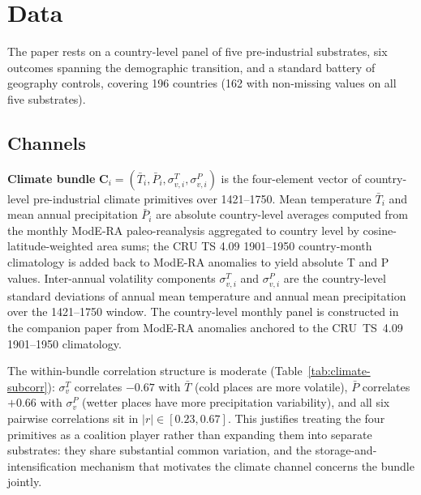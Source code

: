\documentclass[11pt,letterpaper]{article}
\begin{document}
\section{Data}
\label{sec:data}

The paper rests on a country-level panel of five pre-industrial substrates, six outcomes spanning the demographic transition, and a standard battery of geography controls, covering 196 countries (162 with non-missing values on all five substrates).

\subsection{Channels}
\label{sec:data-channels}

\textbf{Climate bundle} $\mathbf{C}_i = (\bar T_i, \bar P_i, \sigma_{v,i}^T, \sigma_{v,i}^P)$ is the four-element vector of country-level pre-industrial climate primitives over 1421--1750. Mean temperature $\bar T_i$ and mean annual precipitation $\bar P_i$ are absolute country-level averages computed from the monthly ModE-RA paleo-reanalysis \citep{franke2023modera} aggregated to country level by cosine-latitude-weighted area sums; the CRU TS 4.09 \citep{harris2020cruts} 1901--1950 country-month climatology is added back to ModE-RA anomalies to yield absolute T and P values. Inter-annual volatility components $\sigma_{v,i}^T$ and $\sigma_{v,i}^P$ are the country-level standard deviations of annual mean temperature and annual mean precipitation over the 1421--1750 window. The country-level monthly panel is constructed in the companion paper \citep{alonso_long_shadow} from ModE-RA anomalies anchored to the CRU~TS~4.09 1901--1950 climatology.

The within-bundle correlation structure is moderate (Table~\ref{tab:climate-subcorr}): $\sigma_v^T$ correlates $-0.67$ with $\bar T$ (cold places are more volatile), $\bar P$ correlates $+0.66$ with $\sigma_v^P$ (wetter places have more precipitation variability), and all six pairwise correlations sit in $|r|\in[0.23, 0.67]$. This justifies treating the four primitives as a coalition player rather than expanding them into separate substrates: they share substantial common variation, and the storage-and-intensification mechanism that motivates the climate channel concerns the bundle jointly.
\end{document}
